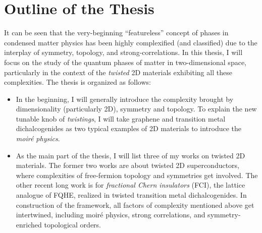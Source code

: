 \section{Outline of the Thesis}
It can be seen that the very-beginning ``featureless'' concept of phases in condensed matter physics has been highly complexified (and classified) due to the interplay of symmetry, topology, and strong-correlations. In this thesis, I will focus on the study of the quantum phases of matter in two-dimensional space, particularly in the context of the \emph{twisted} 2D materials exhibiting all these complexities. The thesis is organized as follows:
\begin{itemize}
    \item In the beginning, I will generally introduce the complexity brought by dimensionality (particularly 2D), symmetry and topology. To explain the new tunable knob of \emph{twistings}, I will take graphene and transition metal dichalcogenides as two typical examples of 2D materials to introduce the \emph{moir\'{e} physics}.
    \item As the main part of the thesis, I will list three of my works on twisted 2D materials. The former two works are about twisted 2D superconductors, where complexities of free-fermion topology and symmetries get involved. The other recent long work is for \emph{fractional Chern insulators} (FCI), the lattice analogue of FQHE, realized in twisted transition metal dichalcogenides. In construction of the framework, all factors of complexity mentioned above get intertwined, including moir\'{e} physics, strong correlations, and symmetry-enriched topological orders.
\end{itemize}


